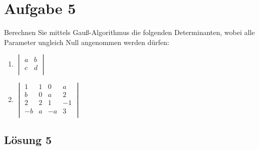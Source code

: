 \documentclass[main.tex]{subfiles}
\begin{document}
\section{Aufgabe 5}
Berechnen Sie mittels Gauß-Algorithmus die folgenden Determinanten, wobei alle Parameter ungleich Null angenommen werden dürfen:

\begin{enumerate}
    \item $\begin{vmatrix}
        a & b \\
        c & d \\
    \end{vmatrix}$
    \item $\begin{vmatrix}
         1 & 1 &  0 &  a \\
         b & 0 &  a &  2 \\
         2 & 2 &  1 & -1 \\
        -b & a & -a &  3 \\
    \end{vmatrix}$
\end{enumerate}

\subsection{Lösung 5}
\end{document}
